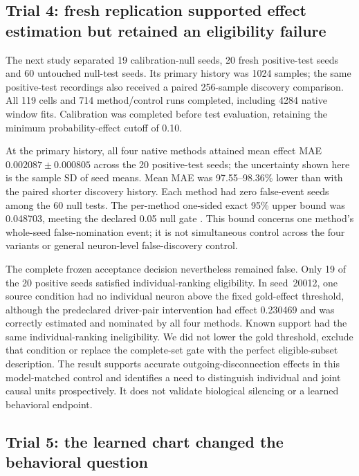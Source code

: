 \subsection{Trial 4: fresh replication supported effect estimation but retained an eligibility failure}

The next study separated 19 calibration-null seeds, 20 fresh positive-test
seeds and 60 untouched null-test seeds. Its primary history was 1024 samples;
the same positive-test recordings also received a paired 256-sample discovery
comparison. All 119 cells and 714 method/control runs completed, including
4284 native window fits. Calibration was completed before test evaluation,
retaining the minimum probability-effect cutoff of 0.10.

At the primary history, all four native methods attained mean effect MAE
$0.002087\pm0.000805$ across the 20 positive-test seeds; the uncertainty shown
here is the sample SD of seed means. Mean MAE was 97.55--98.36\% lower than
with the paired shorter discovery history. Each method had zero false-event
seeds among the 60 null tests. The per-method one-sided exact 95\% upper bound
was 0.048703, meeting the declared 0.05 null gate
\citep{clopper1934confidence}. This bound concerns one method's whole-seed
false-nomination event; it is not simultaneous control across the four variants
or general neuron-level false-discovery control.

The complete frozen acceptance decision nevertheless remained false. Only
19 of the 20 positive seeds satisfied individual-ranking eligibility. In
seed~20012, one source condition had no individual neuron above the fixed
gold-effect threshold, although the predeclared driver-pair intervention had
effect 0.230469 and was correctly estimated and nominated by all four methods.
Known support had the same individual-ranking ineligibility. We did not lower
the gold threshold, exclude that condition or replace the complete-set gate
with the perfect eligible-subset description. The result supports accurate
outgoing-disconnection effects in this model-matched control and identifies a
need to distinguish individual and joint causal units prospectively. It does
not validate biological silencing or a learned behavioral endpoint.

\subsection{Trial 5: the learned chart changed the behavioral question}

